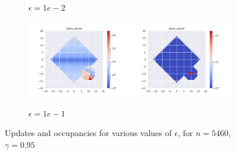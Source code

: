 \documentclass[runningheads]{llncs}
\begin{document}
\begin{figure}[H]
\begin{subfigure}[b]{\textwidth}
        \caption{$\epsilon=1e-2$}
    \end{subfigure}
    \begin{subfigure}[b]{\textwidth}
        \centering
        \includegraphics[width=0.49\textwidth]{img/epsilon/1e-1/updates_state_aware.pdf}
        \includegraphics[width=0.49\textwidth]{img/epsilon/1e-2/occupations_state_aware.pdf}
        \caption{$\epsilon=1e-1$}
    \end{subfigure}
    \caption{Updates and occupancies for various values of $\epsilon$, for $n = 5460$, $\gamma=0.95$}
    \label{fig:epsilon_1}
\end{figure}
\end{document}
